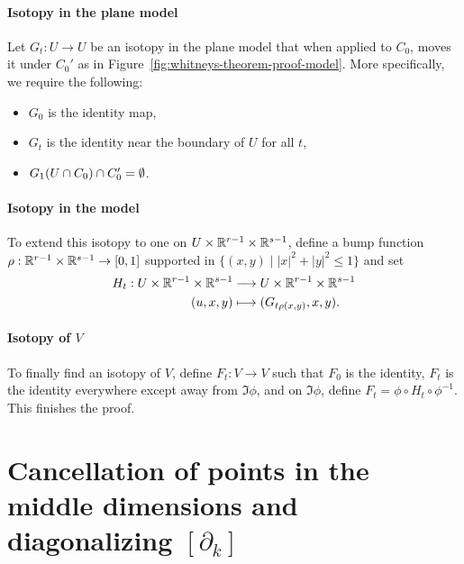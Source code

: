 \begin{myproof}
    \paragraph{Isotopy in the plane model}
    Let $G_t: U \to U$ be an isotopy in the plane model that when applied to $C_0$, moves it under $C_0'$ as in Figure~\ref{fig:whitneys-theorem-proof-model}.
    More specifically, we require the following:
    \begin{itemize}
        \item $G_0$ is the identity map,
        \item $G_t$ is the identity near the boundary of  $U$ for all $t$,
        \item  $ G_1(U \cap C_0) \cap C_0' = \emptyset$.
    \end{itemize}
    \paragraph{Isotopy in the model}
    To extend this isotopy to one on $U \times \mathbb{R}^{r-1} \times \mathbb{R}^{s-1}$, define a bump function $\rho: \mathbb{R}^{r-1}\times \mathbb{R}^{s-1} \to  [0,1]$ supported in $\{(x, y)  \mid |x|^2 + |y|^2 \le  1\}$ and set
    \begin{align*}
        H_t: U \times \mathbb{R}^{r-1}\times \mathbb{R}^{s-1} &\longrightarrow  U \times \mathbb{R}^{r-1} \times \mathbb{R}^{s-1}\\
        (u, x, y) &\longmapsto (G_{t \rho(x, y)}, x, y)
    .\end{align*}
    \paragraph{Isotopy of $V$}
    To finally find an isotopy of $V$, define $F_t: V\to V$ such that
    $F_0$ is the identity, $F_t$ is the identity everywhere except away from  $\Im \phi$, and on  $\Im \phi$, define  $F_t = \phi  \circ  H_t  \circ  \phi^{-1}$.
    This finishes the proof.
\end{myproof}

\section[Cancellation of points in the middle dimensions]{Cancellation of points in the middle dimensions and diagonalizing $[\partial_k]$}

